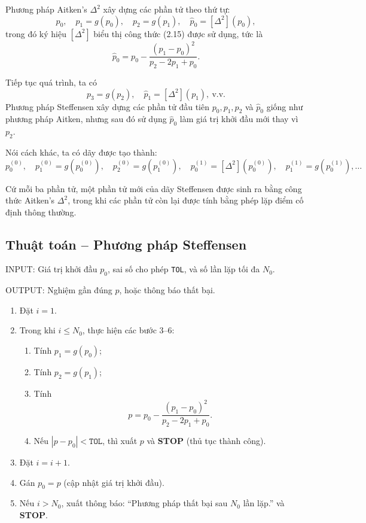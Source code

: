 Phương pháp Aitken’s $\Delta^2$ xây dựng các phần tử theo thứ tự:
\[
p_0, \quad p_1 = g(p_0), \quad p_2 = g(p_1), \quad 
\hat{p}_0 = [\Delta^2](p_0),
\]
trong đó ký hiệu $[\Delta^2]$ biểu thị công thức (2.15) được sử dụng, tức là
\[
\hat{p}_0 = p_0 - \frac{(p_1 - p_0)^2}{p_2 - 2p_1 + p_0}.
\]

Tiếp tục quá trình, ta có
\[
p_3 = g(p_2), \quad \hat{p}_1 = [\Delta^2](p_1), \ \text{v.v.}
\]
Phương pháp Steffensen xây dựng các phần tử đầu tiên $p_0, p_1, p_2$ và $\hat{p}_0$ 
giống như phương pháp Aitken, nhưng sau đó sử dụng $\hat{p}_0$ 
làm giá trị khởi đầu mới thay vì $p_2$.  

Nói cách khác, ta có dãy được tạo thành:
\[
p_0^{(0)}, \quad 
p_1^{(0)} = g(p_0^{(0)}), \quad 
p_2^{(0)} = g(p_1^{(0)}), \quad 
p_0^{(1)} = [\Delta^2](p_0^{(0)}), \quad 
p_1^{(1)} = g(p_0^{(1)}), \ldots
\]

Cứ mỗi ba phần tử, một phần tử mới của dãy Steffensen được sinh ra bằng công thức Aitken’s $\Delta^2$, 
trong khi các phần tử còn lại được tính bằng phép lặp điểm cố định thông thường.  

\subsection*{\textbf{Thuật toán – Phương pháp Steffensen}}

INPUT:
Giá trị khởi đầu $p_0$, sai số cho phép \texttt{TOL}, 
và số lần lặp tối đa $N_0$.

OUTPUT:
Nghiệm gần đúng $p$, hoặc thông báo thất bại.

\begin{enumerate}
  \item Đặt $i = 1$.
  \item Trong khi $i \le N_0$, thực hiện các bước 3–6:
  \begin{enumerate}
    \item Tính $p_1 = g(p_0)$; 
    \item Tính $p_2 = g(p_1)$;
    \item Tính
    \[
    p = p_0 - \frac{(p_1 - p_0)^2}{p_2 - 2p_1 + p_0}.
    \]
    \item Nếu $|p - p_0| < \texttt{TOL}$, 
    thì xuất $p$ và \textbf{STOP} (thủ tục thành công).
  \end{enumerate}
  \item Đặt $i = i + 1$.
  \item Gán $p_0 = p$ (cập nhật giá trị khởi đầu).
  \item Nếu $i > N_0$, xuất thông báo: 
  ``Phương pháp thất bại sau $N_0$ lần lặp.'' và \textbf{STOP}.
\end{enumerate}

